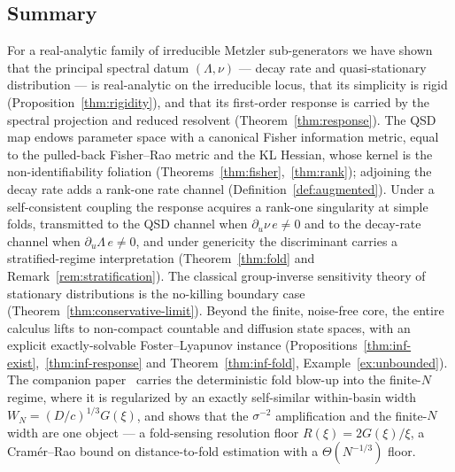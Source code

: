\documentclass[11pt,reqno]{amsart}
\theoremstyle{plain}
\theoremstyle{definition}
\theoremstyle{remark}
\begin{document}
\subsection{Summary}
For a real-analytic family of irreducible Metzler sub-generators we have shown
that the principal spectral datum $(\Lambda,\nu)$ --- decay rate and
quasi-stationary distribution --- is real-analytic on the irreducible locus, that
its simplicity is rigid (Proposition~\ref{thm:rigidity}), and that its first-order
response is carried by the spectral projection and reduced resolvent
(Theorem~\ref{thm:response}). The QSD map endows parameter space with a canonical
Fisher information metric, equal to the pulled-back Fisher--Rao metric and the KL
Hessian, whose kernel is the non-identifiability foliation
(Theorems~\ref{thm:fisher},~\ref{thm:rank}); adjoining the decay rate adds a
rank-one rate channel (Definition~\ref{def:augmented}). Under a self-consistent
coupling the response acquires a rank-one singularity at simple folds, transmitted
to the QSD channel when $\partial_u\nu\,e\neq0$ and to the decay-rate channel when
$\partial_u\Lambda\,e\neq0$, and under genericity the discriminant carries a
stratified-regime interpretation
(Theorem~\ref{thm:fold} and Remark~\ref{rem:stratification}). The classical group-inverse
sensitivity theory of stationary distributions is the no-killing boundary case
(Theorem~\ref{thm:conservative-limit}).
Beyond the finite, noise-free core, the entire calculus lifts to non-compact countable
and diffusion state spaces, with an explicit exactly-solvable Foster--Lyapunov instance
(Propositions~\ref{thm:inf-exist},~\ref{thm:inf-response} and Theorem~\ref{thm:inf-fold}, Example~\ref{ex:unbounded}). The
companion paper~\cite{SarkarFoldSensing} carries the deterministic fold blow-up into the
finite-$N$ regime, where it is regularized by an exactly self-similar within-basin width
$W_N=(D/c)^{1/3}G(\xi)$, and shows that the $\sigma^{-2}$ amplification and the
finite-$N$ width are one object --- a fold-sensing resolution floor $R(\xi)=2G(\xi)/\xi$,
a Cram\'er--Rao bound on distance-to-fold estimation with a $\Theta(N^{-1/3})$ floor.
\end{document}
